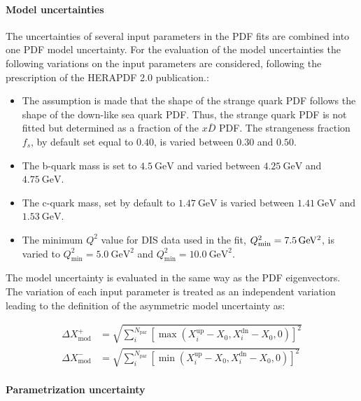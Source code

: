 \paragraph{Model uncertainties} 
The uncertainties of several input parameters in the PDF fits are combined into
one PDF model uncertainty. For the evaluation of the model uncertainties the
following variations on the input parameters are considered, following the
prescription of the HERAPDF 2.0 publication.:
%
\begin{itemize}
\item The assumption is made that the shape of the strange quark PDF follows the
  shape of the down-like sea quark PDF. Thus, the strange quark PDF is not
  fitted but determined as a fraction of the $x\overline{D}$ PDF. The strangeness fraction
  $f_s$, by default set equal to $0.40$, is varied between $0.30$ and $0.50$.
  \item The b-quark mass is set to $\SI{4.5}{\GeV}$ and varied between
  $\SI{4.25}{\GeV}$ and $\SI{4.75}{\GeV}$.
  \item The c-quark mass, set by default to $\SI{1.47}{\GeV}$ is varied between
  $\SI{1.41}{\GeV}$ and $\SI{1.53}{\GeV}$.
  \item The minimum $Q^2$ value for DIS data used in the fit,
    $Q^2_\mathrm{min}=\SI{7.5}{\GeVsq}$, is varied to $Q^2_\mathrm{min} =
    \SI{5.0}{\GeV\squared}$ and $Q^2_\mathrm{min} = \SI{10.0}{\GeV\squared}$.
\end{itemize}
%
The model uncertainty is evaluated in the same way as the PDF eigenvectors.
The variation of each input parameter is treated as an independent variation
leading to the definition of the asymmetric model uncertainty as:

\begin{align*}
  \Delta X^+_{\mathrm{mod}} &= \sqrt{\sum_i^{N_{\mathrm{par}}} \left[ \max(X_i^{\mathrm{up}}
    -X_0, X_i^{\mathrm{dn}} - X_0, 0)\right]^2}\\
    \Delta X^-_{\mathrm{mod}} &= \sqrt{\sum_i^{N_{\mathrm{par}}} \left[ \min(X_i^{\mathrm{up}} - X_0, X_i^{\mathrm{dn}} - X_0,0)\right]^2}
\end{align*}

\paragraph{Parametrization uncertainty}

